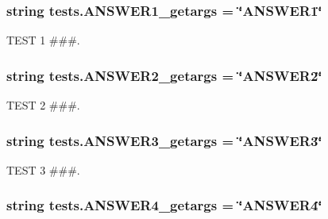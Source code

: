 \subsubsection[{A\+N\+S\+W\+E\+R1\+\_\+getargs}]{\setlength{\rightskip}{0pt plus 5cm}string tests.\+A\+N\+S\+W\+E\+R1\+\_\+getargs = \char`\"{}A\+N\+S\+W\+E\+R1\char`\"{}}\label{namespacetests_a10c32ad045f7c3fbe53ea5c04b2efe80}


T\+E\+S\+T 1 \#\#\#. 

\hypertarget{namespacetests_a5ea93641e8fbe1acbcb6725845c4c679}{}
\subsubsection[{A\+N\+S\+W\+E\+R2\+\_\+getargs}]{\setlength{\rightskip}{0pt plus 5cm}string tests.\+A\+N\+S\+W\+E\+R2\+\_\+getargs = \char`\"{}A\+N\+S\+W\+E\+R2\char`\"{}}\label{namespacetests_a5ea93641e8fbe1acbcb6725845c4c679}


T\+E\+S\+T 2 \#\#\#. 

\hypertarget{namespacetests_a4a97e005b11d1d486c0d893c33976136}{}
\subsubsection[{A\+N\+S\+W\+E\+R3\+\_\+getargs}]{\setlength{\rightskip}{0pt plus 5cm}string tests.\+A\+N\+S\+W\+E\+R3\+\_\+getargs = \char`\"{}A\+N\+S\+W\+E\+R3\char`\"{}}\label{namespacetests_a4a97e005b11d1d486c0d893c33976136}


T\+E\+S\+T 3 \#\#\#. 

\hypertarget{namespacetests_aeb48fc0597680aa32baa2ea0810d63d9}{}
\subsubsection[{A\+N\+S\+W\+E\+R4\+\_\+getargs}]{\setlength{\rightskip}{0pt plus 5cm}string tests.\+A\+N\+S\+W\+E\+R4\+\_\+getargs = \char`\"{}A\+N\+S\+W\+E\+R4\char`\"{}}\label{namespacetests_aeb48fc0597680aa32baa2ea0810d63d9}


